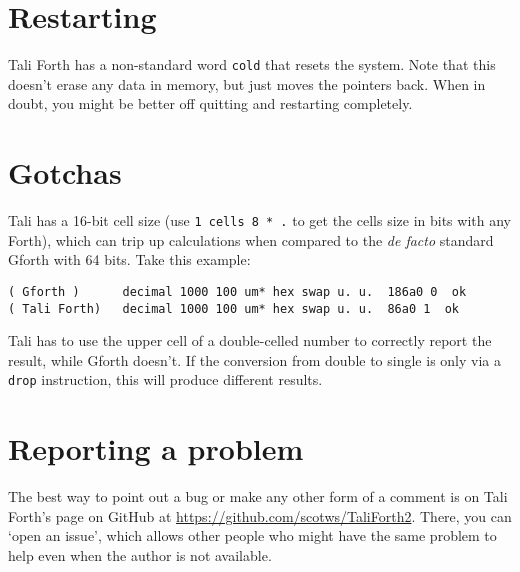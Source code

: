 \section{Restarting}

Tali Forth has a non-standard word \texttt{cold} that
resets the system. Note that this doesn't erase any data in memory, but just
moves the pointers back. When in doubt, you might be better off quitting and
restarting completely.


\section{Gotchas}

Tali has a 16-bit cell size (use \texttt{1 cells 8 * .} to get the cells size in
bits with any Forth), which can trip up calculations when compared to the
\textit{de facto} standard Gforth with 64 bits. Take this example:

\begin{lstlisting}[frame=lines]
( Gforth )      decimal 1000 100 um* hex swap u. u.  186a0 0  ok
( Tali Forth)   decimal 1000 100 um* hex swap u. u.  86a0 1  ok
\end{lstlisting}

\noindent Tali has to use the upper cell of a double-celled
number to correctly report the result, while Gforth doesn't. If the conversion
from double to single is only via a \texttt{drop} instruction, this will produce
different results.



\section{Reporting a problem}

The best way to point out a bug or make any other form of a comment is on Tali
Forth's page on GitHub at
\href{https://github.com/scotws/TaliForth2}{https://github.com/scotws/TaliForth2}.
There, you can `open an issue', which allows other people who might have the
same problem to help even when the author is not available.



